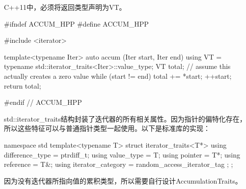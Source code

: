 \begin{notice}
C++11中，必须将返回类型声明为VT。
\end{notice}

\begin{cpp}
#ifndef ACCUM_HPP
#define ACCUM_HPP

#include <iterator>

template<typename Iter>
auto accum (Iter start, Iter end)
{
	using VT = typename std::iterator_traits<Iter>::value_type;
	VT total{}; // assume this actually creates a zero value
	while (start != end) {
		total += *start;
		++start;
	}
	return total;
}

#endif // ACCUM_HPP
\end{cpp}

std::iterator\_traits结构封装了迭代器的所有相关属性。因为指针的偏特化存在，所以这些特征可以与普通指针类型一起使用。以下是标准库的实现：

\begin{cpp}
namespace std {
	template<typename T>
	struct iterator_traits<T*> {
		using difference_type = ptrdiff_t;
		using value_type = T;
		using pointer = T*;
		using reference = T&;
		using iterator_category = random_access_iterator_tag ;
	};
}
\end{cpp}

因为没有迭代器所指向值的累积类型，所以需要自行设计AccumulationTraits。









